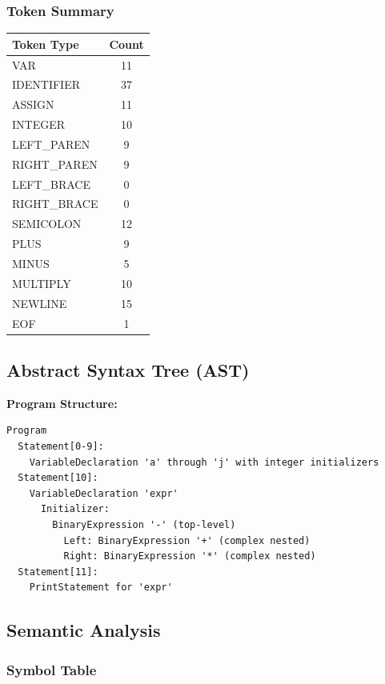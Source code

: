 \documentclass[12pt,a4paper]{report}
\begin{document}
\subsubsection{Token Summary}
\begin{center}
\begin{tabular}{|l|c|}
\hline
\textbf{Token Type} & \textbf{Count} \\
\hline
VAR & 11 \\
IDENTIFIER & 37 \\
ASSIGN & 11 \\
INTEGER & 10 \\
LEFT\_PAREN & 9 \\
RIGHT\_PAREN & 9 \\
LEFT\_BRACE & 0 \\
RIGHT\_BRACE & 0 \\
SEMICOLON & 12 \\
PLUS & 9 \\
MINUS & 5 \\
MULTIPLY & 10 \\
NEWLINE & 15 \\
EOF & 1 \\
\hline
\end{tabular}
\end{center}

\subsection{Abstract Syntax Tree (AST)}

\textbf{Program Structure:}
\begin{verbatim}
Program
  Statement[0-9]:
    VariableDeclaration 'a' through 'j' with integer initializers
  Statement[10]:
    VariableDeclaration 'expr'
      Initializer:
        BinaryExpression '-' (top-level)
          Left: BinaryExpression '+' (complex nested)
          Right: BinaryExpression '*' (complex nested)
  Statement[11]:
    PrintStatement for 'expr'
\end{verbatim}

\subsection{Semantic Analysis}

\subsubsection{Symbol Table}
\end{document}
